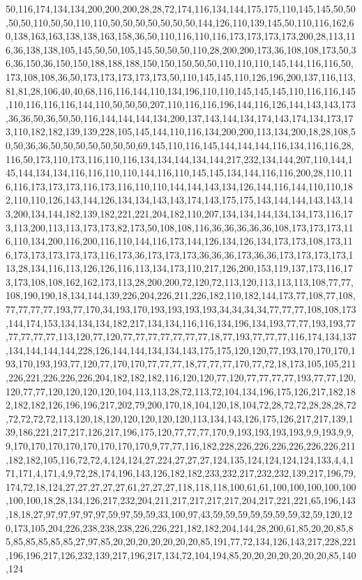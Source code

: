 50,116,174,134,134,200,200,200,28,28,72,174,116,134,144,175,175,110,145,145,50,50,50,50,110,50,50,110,110,50,50,50,50,50,50,50,144,126,110,139,145,50,110,116,162,60,138,163,163,138,138,163,158,36,50,110,116,110,116,173,173,173,173,200,28,113,116,36,138,138,105,145,50,50,105,145,50,50,50,110,28,200,200,173,36,108,108,173,50,36,36,150,36,150,150,188,188,188,150,150,150,50,50,110,110,110,145,144,116,116,50,173,108,108,36,50,173,173,173,173,173,50,110,145,145,110,126,196,200,137,116,113,81,81,28,106,40,40,68,116,116,144,110,134,196,110,110,145,145,145,110,116,116,145,110,116,116,116,144,110,50,50,50,207,110,116,116,196,144,116,126,144,143,143,173,36,36,50,36,50,50,116,144,144,144,134,200,137,143,144,134,174,143,174,134,173,173,110,182,182,139,139,228,105,145,144,110,116,134,200,200,113,134,200,18,28,108,50,50,36,36,50,50,50,50,50,50,50,69,145,110,116,145,144,144,144,116,134,116,116,28,116,50,173,110,173,116,110,116,134,134,144,134,144,217,232,134,144,207,110,144,145,144,134,134,116,116,110,110,144,116,110,145,145,134,144,116,116,200,28,110,116,116,173,173,173,116,173,116,110,110,144,144,143,134,126,144,116,144,110,110,182,110,110,126,143,144,126,134,134,143,143,174,143,175,175,143,144,144,143,143,143,200,134,144,182,139,182,221,221,204,182,110,207,134,134,144,134,134,173,116,173,113,200,113,113,173,173,82,173,50,108,108,116,36,36,36,36,36,108,173,173,173,116,110,134,200,116,200,116,110,144,116,173,144,126,134,126,134,173,173,108,173,116,173,173,173,173,173,116,173,36,173,173,173,36,36,36,173,36,36,173,173,173,173,113,28,134,116,113,126,126,116,113,134,173,110,217,126,200,153,119,137,173,116,173,173,108,108,162,162,173,113,28,200,200,72,120,72,113,120,113,113,113,108,77,77,108,190,190,18,134,144,139,226,204,226,211,226,182,110,182,144,173,77,108,77,108,77,77,77,77,193,77,170,34,193,170,193,193,193,193,34,34,34,34,77,77,77,108,108,173,144,174,153,134,134,134,182,217,134,134,116,116,134,196,134,193,77,77,193,193,77,77,77,77,77,113,120,77,120,77,77,77,77,77,77,77,18,77,193,77,77,77,116,174,134,137,134,144,144,144,228,126,144,144,134,134,143,175,175,120,120,77,193,170,170,170,193,170,193,193,77,120,77,170,170,77,77,77,18,77,77,77,170,77,72,18,173,105,105,211,226,221,226,226,226,204,182,182,182,116,120,120,77,120,77,77,77,77,193,77,77,120,120,77,77,120,120,120,120,104,113,113,28,72,113,72,104,134,196,175,126,217,182,182,182,182,126,196,196,217,202,79,200,170,18,104,120,18,104,72,28,72,72,28,28,28,72,72,72,72,72,113,120,18,120,120,120,120,120,113,134,143,126,175,126,217,217,139,139,186,221,217,217,126,217,196,175,120,77,77,77,170,9,193,193,193,193,9,9,193,9,9,9,170,170,170,170,170,170,170,170,9,77,77,116,182,228,226,226,226,226,226,226,211,182,182,105,116,72,72,4,124,124,27,224,27,27,27,124,135,124,124,124,124,133,4,4,171,171,4,171,4,9,72,28,174,196,143,126,182,182,233,232,217,232,232,139,217,196,79,174,72,18,124,27,27,27,27,27,61,27,27,27,118,118,118,100,61,61,100,100,100,100,100,100,100,18,28,134,126,217,232,204,211,217,217,217,217,204,217,221,221,65,196,143,18,18,27,97,97,97,97,97,59,97,59,59,33,100,97,43,59,59,59,59,59,59,59,32,59,120,120,173,105,204,226,238,238,238,226,226,221,182,182,204,144,28,200,61,85,20,20,85,85,85,85,85,85,85,27,97,85,20,20,20,20,20,20,20,85,191,77,72,134,126,143,217,228,221,196,196,217,126,232,139,217,196,217,134,72,104,194,85,20,20,20,20,20,20,20,85,140,124